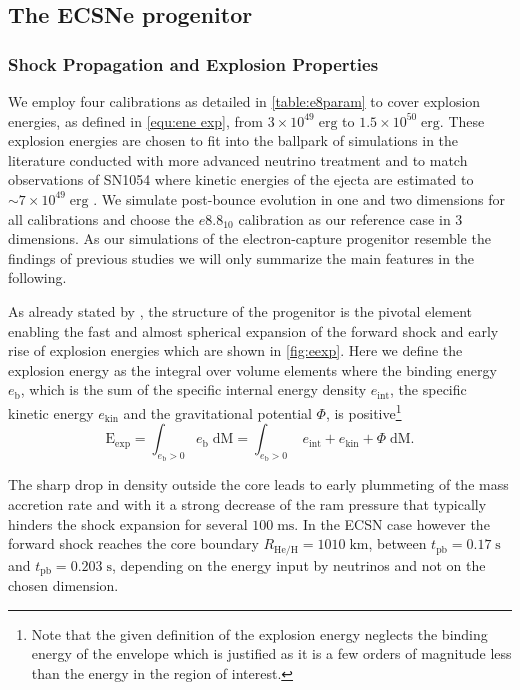 \documentclass[fleqn,usenatbib]{mnras}
\begin{document}
\subsection{The ECSNe progenitor}
\subsubsection{Shock Propagation and Explosion Properties}
\label{sec:explosion ecsn}

We employ four calibrations as detailed in \autoref{table:e8param} to cover explosion energies, as defined in \autoref{equ:ene exp}, from $3\times 10^{49}\;\mathrm{erg}$ to $1.5\times 10^{50}\;\mathrm{erg}$. These explosion energies are chosen to fit into the ballpark of simulations in the literature conducted with more advanced neutrino treatment and to match observations of SN1054 where kinetic energies of the ejecta are estimated to $\sim 7 \times 10^{49}\;\mathrm{erg}$ \cite{Smith2013}. We simulate post-bounce evolution in one and two dimensions for all calibrations and choose the $e8.8_{10}$ calibration as our reference case in 3 dimensions. 
As our simulations of the electron-capture progenitor resemble the findings of previous studies we will only summarize the main features in the following.

As already stated by \cite{Janka2008}, the structure of the progenitor is the pivotal element enabling the fast and almost spherical expansion of the forward shock and early rise of explosion energies which are shown in \autoref{fig:eexp}. 
Here we define the explosion energy as the integral over volume elements where the binding energy $e_\mathrm{b}$, which is the sum of the specific internal energy density $e_{\mathrm{int}}$, the specific kinetic energy $e_{\mathrm{kin}}$ and the gravitational potential $\Phi$, is positive\footnote{Note that the given definition of the explosion energy neglects the binding energy of the envelope which is justified as it is a few orders of magnitude less than the energy in the region of interest.}
\begin{equation}
    \mathrm{E}_{\mathrm{exp}} = \int_{e_{\mathrm{b}} > 0} e_{\mathrm{b}} \; \mathrm{dM} =
    \int_{e_{\mathrm{b}} > 0}\; e_{\mathrm{int}} + e_{\mathrm{kin}} + \Phi \; \mathrm{dM}.
    \label{equ:ene exp}
\end{equation}

The sharp drop in density outside the core leads to early plummeting of the mass accretion rate and with it a strong decrease of the ram pressure that typically hinders the shock expansion for several $100\;\mathrm{ms}$. In the ECSN case however the forward shock reaches the core boundary $R_{\mathrm{He/H}}=1010\;\mathrm{km}$, between $t_{\mathrm{pb}}=0.17\;\mathrm{s}$ and $t_{\mathrm{pb}}=0.203\;\mathrm{s}$, depending on the energy input by neutrinos and not on the chosen dimension.
\end{document}
